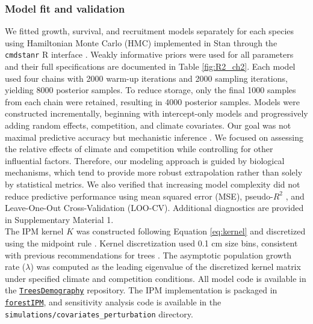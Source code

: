 \hypertarget{model-fit-and-validation}{%
\subsubsection{Model fit and
validation}\label{model-fit-and-validation}}

We fitted growth, survival, and recruitment models separately for each
species using Hamiltonian Monte Carlo (HMC) implemented in Stan
\citep[version 2.30.1][]{stan2022stan} through the \texttt{cmdstanr} R
interface \citep[version 0.5.3][]{cmdstanr}. Weakly informative priors
were used for all parameters and their full specifications are
documented in Table \ref{fig:R2_ch2}. Each model used four chains with 2000 warm-up
iterations and 2000 sampling iterations, yielding 8000 posterior
samples. To reduce storage, only the final 1000 samples from each chain
were retained, resulting in 4000 posterior samples. Models were
constructed incrementally, beginning with intercept-only models and
progressively adding random effects, competition, and climate
covariates. Our goal was not maximal predictive accuracy but mechanistic
inference \citep{Tredennick2021}. We focused on assessing the relative
effects of climate and competition while controlling for other
influential factors. Therefore, our modeling approach is guided by
biological mechanisms, which tend to provide more robust extrapolation
\citep{Briscoe2019} rather than solely by statistical metrics. We also
verified that increasing model complexity did not reduce predictive
performance using mean squared error (MSE), pseudo-\(R^2\)
\citep{Gelman2019}, and Leave-One-Out Cross-Validation (LOO-CV).
Additional diagnostics are provided in Supplementary Material 1.\\

The IPM kernel \(K\) was constructed following Equation \ref{eq:kernel}
and discretized using the midpoint rule \citep{Ellner2016}. Kernel
discretization used 0.1 cm size bins, consistent with previous
recommendations for trees \citep{zuidema2010integral}. The asymptotic
population growth rate (\(\lambda\)) was computed as the leading
eigenvalue of the discretized kernel matrix under specified climate and
competition conditions. All model code is available in the
\href{https://github.com/willvieira/TreesDemography}{\texttt{TreesDemography}}
repository. The IPM implementation is packaged in
\href{https://github.com/willvieira/forestIPM}{\texttt{forestIPM}}, and
sensitivity analysis code is available in the
\texttt{simulations/covariates\_perturbation} directory.\\

